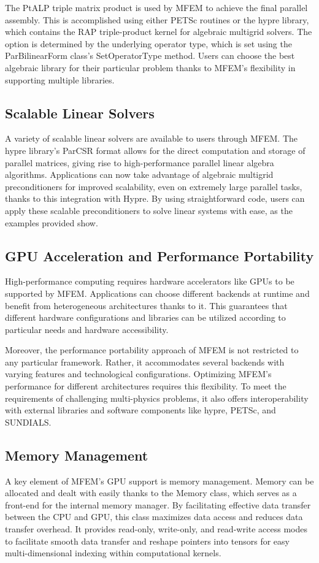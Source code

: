 \documentclass{article}
\begin{document}
The PtALP triple matrix product is used by MFEM to achieve the final parallel assembly. This is accomplished using either PETSc routines or the hypre library, which contains the RAP triple-product kernel for algebraic multigrid solvers. The option is determined by the underlying operator type, which is set using the ParBilinearForm class's SetOperatorType method. Users can choose the best algebraic library for their particular problem thanks to MFEM's flexibility in supporting multiple libraries.

\subsection{Scalable Linear Solvers}
A variety of scalable linear solvers are available to users through MFEM. The hypre library's ParCSR format allows for the direct computation and storage of parallel matrices, giving rise to high-performance parallel linear algebra algorithms. Applications can now take advantage of algebraic multigrid preconditioners for improved scalability, even on extremely large parallel tasks, thanks to this integration with Hypre. By using straightforward code, users can apply these scalable preconditioners to solve linear systems with ease, as the examples provided show.
\subsection{GPU Acceleration and Performance Portability}
High-performance computing requires hardware accelerators like GPUs to be supported by MFEM. Applications can choose different backends at runtime and benefit from heterogeneous architectures thanks to it. This guarantees that different hardware configurations and libraries can be utilized according to particular needs and hardware accessibility.

Moreover, the performance portability approach of MFEM is not restricted to any particular framework. Rather, it accommodates several backends with varying features and technological configurations. Optimizing MFEM's performance for different architectures requires this flexibility. To meet the requirements of challenging multi-physics problems, it also offers interoperability with external libraries and software components like hypre, PETSc, and SUNDIALS.

\subsection{Memory Management}
A key element of MFEM's GPU support is memory management. Memory can be allocated and dealt with easily thanks to the Memory class, which serves as a front-end for the internal memory manager. By facilitating effective data transfer between the CPU and GPU, this class maximizes data access and reduces data transfer overhead. It provides read-only, write-only, and read-write access modes to facilitate smooth data transfer and reshape pointers into tensors for easy multi-dimensional indexing within computational kernels.
\end{document}
